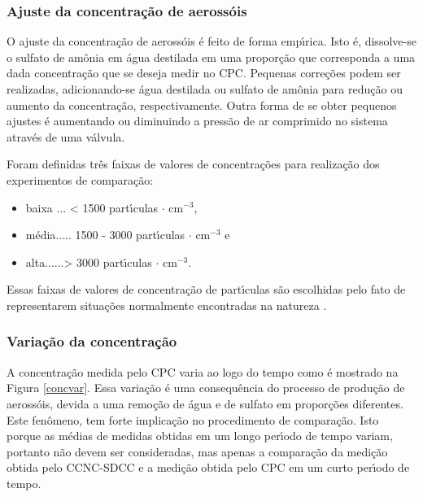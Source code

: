 \subsubsection {Ajuste da concentra\c{c}\~{a}o de aeross\'{o}is}
O ajuste da concentra\c{c}\~{a}o de aeross\'{o}is \'{e} feito de forma emp\'{\i}rica. Isto \'{e}, dissolve-se o sulfato de am\^{o}nia em \'{a}gua destilada em uma propor\c{c}\~{a}o que corresponda a  uma dada concentra\c{c}\~{a}o que se deseja medir no CPC. Pequenas corre\c{c}\~{o}es podem ser realizadas, adicionando-se \'{a}gua destilada ou sulfato de am\^{o}nia para redu\c{c}\~{a}o ou aumento da concentra\c{c}\~{a}o, respectivamente. Outra forma de se obter pequenos ajustes \'{e} aumentando ou diminuindo a press\~{a}o de ar comprimido no sistema atrav\'{e}s de uma v\'{a}lvula.


Foram definidas tr\^{e}s faixas de valores de concentra\c{c}\~{o}es para realiza\c{c}\~{a}o dos experimentos de compara\c{c}\~{a}o:
\begin {itemize}
\item baixa ... < 1500 part\'{\i}culas $\cdot$ cm$^{-3}$,
\item m\'{e}dia.....  1500 - 3000 part\'{\i}culas $\cdot$ cm$^{-3}$ e
\item alta......> 3000 part\'{\i}culas $\cdot$ cm$^{-3}$.
\end{itemize}

\noindent Essas faixas de valores de concentra\c{c}\~{a}o de part\'{\i}culas s\~{a}o escolhidas pelo fato de representarem situa\c{c}\~{o}es normalmente encontradas na natureza \cite{Andreae}.




\subsubsection {Varia\c{c}\~{a}o da concentra\c{c}\~{a}o}
A concentra\c{c}\~{a}o medida pelo CPC varia ao logo do tempo como \'{e} mostrado na Figura \ref{concvar}. Essa varia\c{c}\~{a}o \'{e} uma consequ\^{e}ncia do processo de produ\c{c}\~{a}o de aeross\'{o}is, devida a uma remo\c{c}\~{a}o de \'{a}gua e de sulfato em propor\c{c}\~{o}es diferentes. Este fen\^{o}meno, tem forte implica\c{c}\~{a}o no procedimento de compara\c{c}\~{a}o. Isto porque as m\'{e}dias de medidas obtidas em um longo per\'{\i}odo de tempo variam, portanto n\~{a}o devem ser consideradas, mas apenas a compara\c{c}\~{a}o da medi\c{c}\~{a}o obtida pelo CCNC-SDCC e a medi\c{c}\~{a}o obtida pelo CPC em um curto per\'{\i}odo de tempo.

